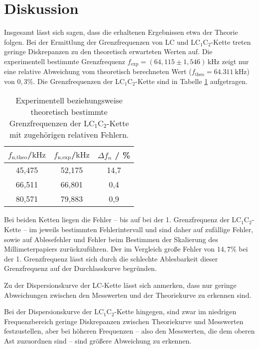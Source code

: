 \section{Diskussion}
\label{sec:Diskussion}
Insgesamt lässt sich sagen, dass die erhaltenen Ergebnissen etwa der Theorie folgen.
\FloatBarrier
Bei der Ermittlung der Grenzfrequenzen von LC und LC$_1$C$_2$-Kette treten geringe 
Diskrepanzen zu den theoretisch erwarteten Werten auf.
Die experimentell bestimmte Grenzfrequenz $f_{\text{exp}}=(64,115 \pm 1,546) \, \si{\kilo\hertz}$
zeigt nur eine relative Abweichung vom theoretisch berechneten Wert ($f_{\text{theo}}=\SI{64,311}{\kilo\hertz}$) von $0,3\%$.
Die Grenzfrequenzen der LC$_1$C$_2$-Kette sind in Tabelle \ref{tab:halleluja} aufgetragen.
\begin{table}
	\caption{Experimentell beziehungsweise theoretisch bestimmte Grenzfrequenzen der LC$_1$C$_2$-Kette mit zugehörigen relativen Fehlern.}
	\label{tab:halleluja}
	\centering
	\begin{tabular}{ccc}
		\toprule
		$f_{\text{n,theo}}$/$\si{\kilo\hertz}$ & $f_{\text{n,exp}}$/$\si{\kilo\hertz}$ & $\Delta f_n$ / \% \\
		\midrule
		45,475                   & 52,175 & 14,7         \\
		66,511                   & 66,801 & 0,4          \\
		80,571                   & 79,883 & 0,9          \\
		\bottomrule
	\end{tabular}
\end{table}

Bei beiden Ketten liegen die Fehler -- bis auf bei der 1. Grenzfrequenz der LC$_1$C$_2$-Kette -- 
im jeweils bestimmten Fehlerintervall und sind daher auf 
zufällige Fehler, sowie auf Ablesefehler und Fehler beim Bestimmen der Skalierung des 
Millimeterpapiers zurückzuführen.
Der im Vergleich große Fehler von $14,7 \%$ bei der 1. Grenzfrequenz lässt sich durch die
schlechte Ablesbarkeit dieser Grenzfrequenz auf der Durchlasskurve begründen.
\FloatBarrier

Zu der Dispersionskurve der LC-Kette lässt sich anmerken, dass nur geringe Abweichungen zwischen 
den Messwerten und der Theoriekurve zu erkennen sind.

Bei der Dispersionskurve der LC$_1$C$_2$-Kette hingegen, sind zwar im niedrigen Frequenzbereich 
geringe Diskrepanzen zwischen Theoriekurve und Messwerten festzustellen, aber bei höheren 
Frequenzen -- also den Messwerten, die dem oberen Ast zuzuordnen sind -- sind größere Abweichung 
zu erkennen.

